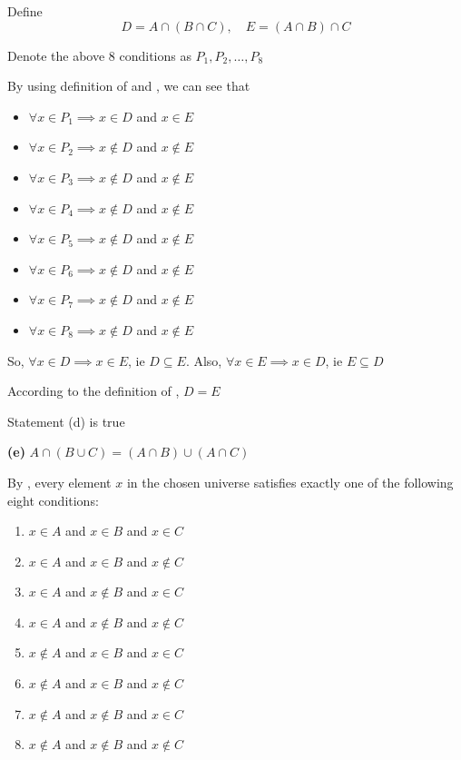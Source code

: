 \documentclass[12pt]{article}
\begin{document}
Define 
\[D= A \cap (B \cap C), \quad E = (A \cap B) \cap C\] 

Denote the above 8 conditions as $P_1, P_2, \ldots, P_8$

By using definition of  and , we can see that
\begin{itemize}[nosep]
\item $\forall x \in P_1 \implies x \in D$ and $x \in E$
\item $\forall x \in P_2 \implies x \notin D$ and $x \notin E$
\item $\forall x \in P_3 \implies x \notin D$ and $x \notin E$
\item $\forall x \in P_4 \implies x \notin D$ and $x \notin E$
\item $\forall x \in P_5 \implies x \notin D$ and $x \notin E$
\item $\forall x \in P_6 \implies x \notin D$ and $x \notin E$
\item $\forall x \in P_7 \implies x \notin D$ and $x \notin E$
\item $\forall x \in P_8 \implies x \notin D$ and $x \notin E$
\end{itemize}

So, $\forall x \in D \implies x \in E$, ie $D \subseteq E$. Also, $\forall x \in E \implies x \in D$, ie $E \subseteq D$

According to the definition of , $D = E$

Statement (d) is true

\medskip
\noindent\textbf{(e)}
$A \cap (B \cup C) = (A \cap B) \cup (A \cap C)$

By , every element \(x\) in the chosen
universe satisfies exactly one of the following eight conditions:
\begin{enumerate}[nosep] 
\item $x \in A$ and $x \in B$ and $x \in C$
\item $x \in A$ and $x \in B$ and $x \notin C$
\item $x \in A$ and $x \notin B$ and $x \in C$
\item $x \in A$ and $x \notin B$ and $x \notin C$
\item $x \notin A$ and $x \in B$ and $x \in C$
\item $x \notin A$ and $x \in B$ and $x \notin C$
\item $x \notin A$ and $x \notin B$ and $x \in C$
\item $x \notin A$ and $x \notin B$ and $x \notin C$
\end{enumerate} 
\end{document}
